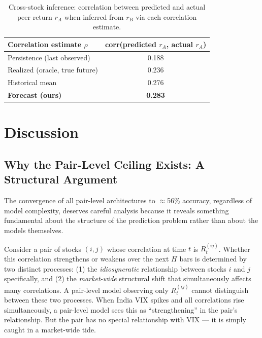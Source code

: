 \documentclass[runningheads]{llncs}
\begin{document}
\begin{table}[H]
\caption{Cross-stock inference: correlation between predicted and actual
peer return $r_A$ when inferred from $r_B$ via each correlation estimate.}
\label{tab:crossstock}
\centering
\begin{tabular}{lc}
\toprule
\textbf{Correlation estimate $\rho$} & \textbf{corr(predicted $r_A$, actual $r_A$)} \\
\midrule
Persistence (last observed)     & 0.188 \\
Realized (oracle, true future)  & 0.236 \\
Historical mean                 & 0.276 \\
\textbf{Forecast (ours)}        & \textbf{0.283} \\
\bottomrule
\end{tabular}
\end{table}

\section{Discussion}\label{sec:discussion}

\subsection{Why the Pair-Level Ceiling Exists: A Structural Argument}

The convergence of all pair-level architectures to $\approx$56\% accuracy,
regardless of model complexity, deserves careful analysis because it
reveals something fundamental about the structure of the prediction
problem rather than about the models themselves.

Consider a pair of stocks $(i, j)$ whose correlation at time $t$ is
$R_t^{(ij)}$. Whether this correlation strengthens or weakens over the
next $H$ bars is determined by two distinct processes: (1) the
\textit{idiosyncratic} relationship between stocks $i$ and $j$ specifically,
and (2) the \textit{market-wide} structural shift that simultaneously
affects many correlations. A pair-level model observing only $R_t^{(ij)}$
cannot distinguish between these two processes. When India VIX spikes and
all correlations rise simultaneously, a pair-level model sees this as
``strengthening'' in the pair's relationship. But the pair has no special
relationship with VIX --- it is simply caught in a market-wide tide.
\end{document}
